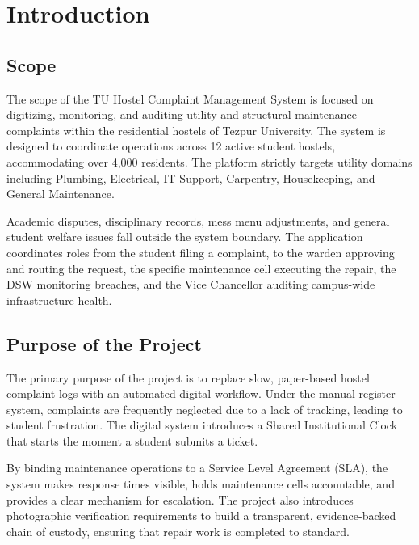 \documentclass[12pt,a4paper]{article}
\begin{document}
\newpage
\tableofcontents

\newpage
\section{Introduction}

\subsection{Scope}
The scope of the TU Hostel Complaint Management System is focused on digitizing, monitoring, and auditing utility and structural maintenance complaints within the residential hostels of Tezpur University. The system is designed to coordinate operations across 12 active student hostels, accommodating over 4,000 residents. The platform strictly targets utility domains including Plumbing, Electrical, IT Support, Carpentry, Housekeeping, and General Maintenance. 

Academic disputes, disciplinary records, mess menu adjustments, and general student welfare issues fall outside the system boundary. The application coordinates roles from the student filing a complaint, to the warden approving and routing the request, the specific maintenance cell executing the repair, the DSW monitoring breaches, and the Vice Chancellor auditing campus-wide infrastructure health.

\subsection{Purpose of the Project}
The primary purpose of the project is to replace slow, paper-based hostel complaint logs with an automated digital workflow. Under the manual register system, complaints are frequently neglected due to a lack of tracking, leading to student frustration. The digital system introduces a Shared Institutional Clock that starts the moment a student submits a ticket. 

By binding maintenance operations to a Service Level Agreement (SLA), the system makes response times visible, holds maintenance cells accountable, and provides a clear mechanism for escalation. The project also introduces photographic verification requirements to build a transparent, evidence-backed chain of custody, ensuring that repair work is completed to standard.
\end{document}
